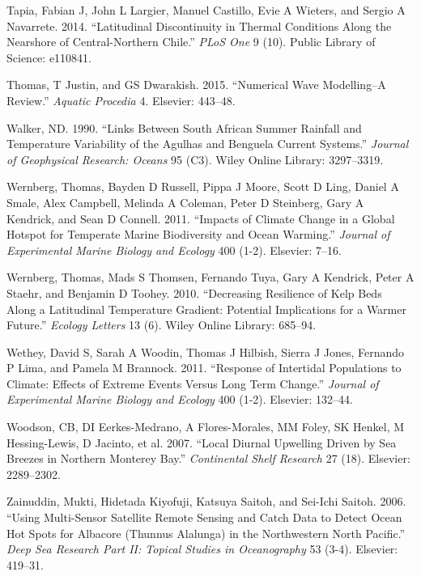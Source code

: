 \documentclass[12pt,A4paper,]{article}
\begin{document}
\hypertarget{ref-Tapia2014}{}
Tapia, Fabian J, John L Largier, Manuel Castillo, Evie A Wieters, and
Sergio A Navarrete. 2014. ``Latitudinal Discontinuity in Thermal
Conditions Along the Nearshore of Central-Northern Chile.'' \emph{PLoS
One} 9 (10). Public Library of Science: e110841.

\hypertarget{ref-Thomas2015}{}
Thomas, T Justin, and GS Dwarakish. 2015. ``Numerical Wave Modelling--A
Review.'' \emph{Aquatic Procedia} 4. Elsevier: 443--48.

\hypertarget{ref-Walker1990}{}
Walker, ND. 1990. ``Links Between South African Summer Rainfall and
Temperature Variability of the Agulhas and Benguela Current Systems.''
\emph{Journal of Geophysical Research: Oceans} 95 (C3). Wiley Online
Library: 3297--3319.

\hypertarget{ref-Wernberg2011}{}
Wernberg, Thomas, Bayden D Russell, Pippa J Moore, Scott D Ling, Daniel
A Smale, Alex Campbell, Melinda A Coleman, Peter D Steinberg, Gary A
Kendrick, and Sean D Connell. 2011. ``Impacts of Climate Change in a
Global Hotspot for Temperate Marine Biodiversity and Ocean Warming.''
\emph{Journal of Experimental Marine Biology and Ecology} 400 (1-2).
Elsevier: 7--16.

\hypertarget{ref-Wernberg2010}{}
Wernberg, Thomas, Mads S Thomsen, Fernando Tuya, Gary A Kendrick, Peter
A Staehr, and Benjamin D Toohey. 2010. ``Decreasing Resilience of Kelp
Beds Along a Latitudinal Temperature Gradient: Potential Implications
for a Warmer Future.'' \emph{Ecology Letters} 13 (6). Wiley Online
Library: 685--94.

\hypertarget{ref-Wethey2011}{}
Wethey, David S, Sarah A Woodin, Thomas J Hilbish, Sierra J Jones,
Fernando P Lima, and Pamela M Brannock. 2011. ``Response of Intertidal
Populations to Climate: Effects of Extreme Events Versus Long Term
Change.'' \emph{Journal of Experimental Marine Biology and Ecology} 400
(1-2). Elsevier: 132--44.

\hypertarget{ref-Woodson2007}{}
Woodson, CB, DI Eerkes-Medrano, A Flores-Morales, MM Foley, SK Henkel, M
Hessing-Lewis, D Jacinto, et al. 2007. ``Local Diurnal Upwelling Driven
by Sea Breezes in Northern Monterey Bay.'' \emph{Continental Shelf
Research} 27 (18). Elsevier: 2289--2302.

\hypertarget{ref-Zainuddin2006}{}
Zainuddin, Mukti, Hidetada Kiyofuji, Katsuya Saitoh, and Sei-Ichi
Saitoh. 2006. ``Using Multi-Sensor Satellite Remote Sensing and Catch
Data to Detect Ocean Hot Spots for Albacore (Thunnus Alalunga) in the
Northwestern North Pacific.'' \emph{Deep Sea Research Part II: Topical
Studies in Oceanography} 53 (3-4). Elsevier: 419--31.
\end{document}
